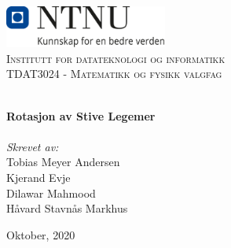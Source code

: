 \begin{titlepage}
\vbox{ }
\vbox{ }
\begin{center}
\includegraphics[width=0.40\textwidth]{rapport/bilder/NTNU_logo.png}\\[1cm]
\textsc{\LARGE Institutt for datateknologi og informatikk}\\[1.5cm]
\textsc{\Large TDAT3024 - Matematikk og fysikk valgfag }\\[0.5cm]
\vbox{ }

\HRule \\[0.4cm]
{ \huge \bfseries Rotasjon av Stive Legemer}\\[0.4cm]
\HRule \\[1.5cm]

\large
\emph{Skrevet av:}\\
Tobias Meyer Andersen\\
Kjerand Evje\\
Dilawar Mahmood\\
Håvard Stavnås Markhus
\vfill

{\large Oktober, 2020}
\end{center}
\end{titlepage}